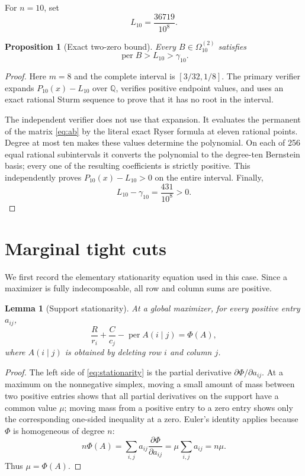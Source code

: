 \documentclass[11pt]{article}
\newtheorem{lemma}[theorem]{Lemma}
\newtheorem{proposition}[theorem]{Proposition}
\theoremstyle{remark}
\newcommand{\per}{\operatorname{per}}
\newcommand{\QQ}{\mathbb Q}
\begin{document}
For $n=10$, set
\begin{equation}\label{eq:L}
 L_{10}=\frac{36719}{10^8}.
\end{equation}

\begin{proposition}[Exact two-zero bound]\label{prop:two-zero-bound}
Every $B\in\Omega_{10}^{(2)}$ satisfies
\[
 \per B>L_{10}>\gamma_{10}.
\]
\end{proposition}
\begin{proof}
Here $m=8$ and the complete interval is $[3/32,1/8]$.  The primary verifier
expands $P_{10}(x)-L_{10}$ over $\QQ$, verifies positive endpoint values, and
uses an exact rational Sturm sequence to prove that it has no root in the
interval.

The independent verifier does not use that expansion.  It evaluates the
permanent of the matrix \eqref{eq:ab} by the literal exact Ryser formula at
eleven rational points.  Degree at most ten makes these values determine the
polynomial.  On each of 256 equal rational subintervals it converts the
polynomial to the degree-ten Bernstein basis; every one of the resulting
coefficients is strictly positive.  This independently proves
$P_{10}(x)-L_{10}>0$ on the entire interval.  Finally,
\[
 L_{10}-\gamma_{10}=\frac{431}{10^8}>0.
\]
\end{proof}

\section{Marginal tight cuts}\label{sec:marginal}

We first record the elementary stationarity equation used in this case.
Since a maximizer is fully indecomposable, all row and column sums are
positive.

\begin{lemma}[Support stationarity]\label{lem:stationarity}
At a global maximizer, for every positive entry $a_{ij}$,
\begin{equation}\label{eq:stationarity}
 \frac{R}{r_i}+\frac{C}{c_j}-\per A(i\mid j)=\Phi(A),
\end{equation}
where $A(i\mid j)$ is obtained by deleting row $i$ and column $j$.
\end{lemma}
\begin{proof}
The left side of \eqref{eq:stationarity} is the partial derivative
$\partial\Phi/\partial a_{ij}$.  At a maximum on the nonnegative simplex,
moving a small amount of mass between two positive entries shows that all
partial derivatives on the support have a common value $\mu$; moving mass
from a positive entry to a zero entry shows only the corresponding one-sided
inequality at a zero.  Euler's identity applies because $\Phi$ is homogeneous
of degree $n$:
\[
 n\Phi(A)=\sum_{i,j}a_{ij}\frac{\partial\Phi}{\partial a_{ij}}
 =\mu\sum_{i,j}a_{ij}=n\mu.
\]
Thus $\mu=\Phi(A)$.
\end{proof}
\end{document}
